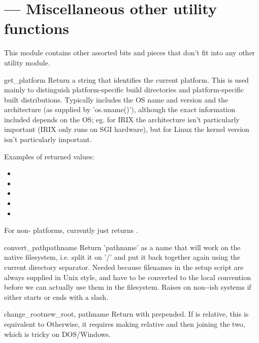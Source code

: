 \documentclass{manual}
\begin{document}
\section{ --- Miscellaneous other utility functions}

This module contains other assorted bits and pieces that don't fit into 
any other utility module.

\begin{funcdesc}{get_platform}{}
Return a string that identifies the current platform.  This is used
mainly to distinguish platform-specific build directories and
platform-specific built distributions.  Typically includes the OS name
and version and the architecture (as supplied by 'os.uname()'),
although the exact information included depends on the OS; eg. for IRIX
the architecture isn't particularly important (IRIX only runs on SGI
hardware), but for Linux the kernel version isn't particularly
important.

Examples of returned values:
\begin{itemize}
\item {}
\item {}
\item {}
\item {}
\item {}
\end{itemize}

For non-\POSIX{} platforms, currently just returns .
\end{funcdesc}

\begin{funcdesc}{convert_path}{pathname}
Return 'pathname' as a name that will work on the native filesystem,
i.e. split it on '/' and put it back together again using the current
directory separator.  Needed because filenames in the setup script are
always supplied in Unix style, and have to be converted to the local
convention before we can actually use them in the filesystem.  Raises
 on non-\UNIX-ish systems if  either 
starts or ends with a slash.
\end{funcdesc}

\begin{funcdesc}{change_root}{new_root, pathname}
Return  with  prepended.  If  is
relative, this is equivalent to 
Otherwise, it requires making  relative and then joining the
two, which is tricky on DOS/Windows.
\end{funcdesc}
\end{document}
